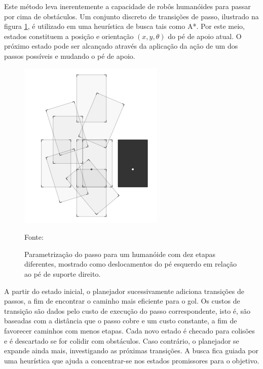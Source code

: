 Este método leva inerentemente a capacidade de robôs humanóides para passar por cima de obstáculos. Um conjunto discreto de
transições de passo, ilustrado na figura \ref{fig:footstep}, é utilizado em uma heurística de busca tais como A*\cite{bperrin}. Por este meio, estados 
constituem a posição e orientação $( x, y, \theta )$ do pé de apoio atual. O próximo estado pode ser alcançado através da aplicação da ação de 
um dos passos possíveis e mudando o pé de apoio.

\begin{figure}[h]

\centering

\includegraphics[scale=0.48]{figuras/footstep.png}

\caption{Parametrização do passo para um humanóide com dez etapas diferentes, mostrado como deslocamentos do pé esquerdo em 
relação ao pé de suporte direito.} Fonte: \cite{phornung} \label{fig:footstep}

\end{figure}
\FloatBarrier

A partir do estado inicial, o planejador sucessivamente adiciona transições de passos, a fim de encontrar o caminho mais eficiente para o gol. 
Os custos de transição são dados pelo custo de execução do passo correspondente, isto é, são baseadas com a distância que o passo cobre e um 
custo constante, a fim de favorecer caminhos com menos etapas. Cada novo estado é checado para colisões e é descartado se for colidir com 
obstáculos. Caso contrário, o planejador se expande ainda mais, investigando as próximas transições. A busca fica guiada por uma heurística
que ajuda a concentrar-se nos estados promissores para o objetivo.


